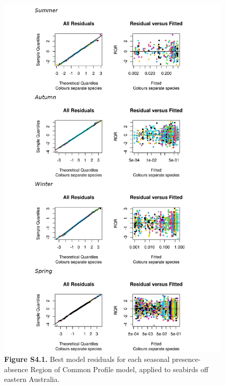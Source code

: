 \documentclass[
]{article}
\begin{document}
\begin{figure}
\centering
\includegraphics{../results/FigS4_1_best-model-residuals-Bernoulli.png}
\caption{\textbf{Figure S4.1.} Best model residuals for each seasonal
presence-absence Region of Common Profile model, applied to seabirds off
eastern Australia.}
\end{figure}

\newpage
\end{document}
